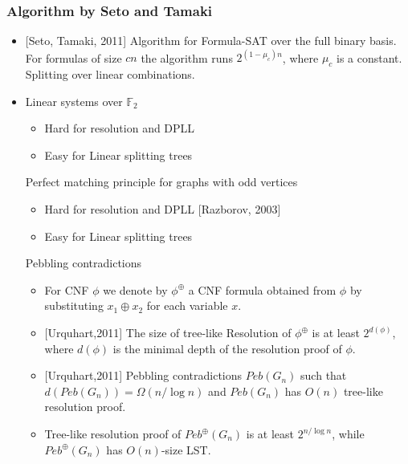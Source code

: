 \begin{frame}
    \frametitle{Algorithm by Seto and Tamaki}

	\begin{itemize}
		\item{} [Seto, Tamaki, 2011] Algorithm for Formula-SAT over the full binary
		    basis. For formulas of size $cn$ the algorithm runs $2^{(1 - \mu_c)n}$,
            where $\mu_c$ is a constant.
		\pitem Splitting over linear combinations.
	\end{itemize}    
\end{frame}


{
\begin{itemize}
\item Linear systems over $\mathbb{F}_2$
\begin{itemize}
\item Hard for resolution and DPLL
\item Easy for Linear splitting trees
\end{itemize}
\pitem Perfect matching principle for graphs with odd vertices
\begin{itemize}
\item Hard for resolution and DPLL [Razborov, 2003]
\item Easy for Linear splitting trees
\end{itemize}
\pitem Pebbling contradictions
\begin{itemize}
\item
For CNF $\phi$ we denote by $\phi^{\oplus}$ a CNF formula
obtained from $\phi$ by substituting $x_1\oplus x_2$ for each variable $x$. 
\item{} [Urquhart,2011] The size of tree-like Resolution of $\phi^{\oplus}$ is at least $2^{d(\phi)}$, where $d(\phi)$ is 
the minimal depth of the resolution proof of $\phi$. 
\item{} [Urquhart,2011] Pebbling contradictions $Peb(G_n)$ such that $d(Peb(G_n))=\Omega(n/\log n)$ 
and $Peb(G_n)$ has $O(n)$ tree-like resolution proof. 
\item Tree-like resolution proof of $Peb^\oplus(G_n)$ is at least $2^{n/\log n}$, while $Peb^\oplus(G_n)$ has $O(n)$-size LST.
\end{itemize}
\end{itemize}



}
